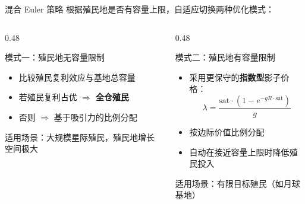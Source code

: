 \documentclass[aspectratio=169, 11pt]{beamer}
\begin{document}
\begin{frame}{混合 Euler 策略}
  根据殖民地是否有容量上限，自适应切换两种优化模式：

  \vspace{0.3cm}
  \begin{columns}[T]
    \begin{column}{0.48\textwidth}
      \begin{block}{模式一：殖民地无容量限制}
        \begin{itemize}
          \item 比较殖民复利效应与基地总容量
          \item 若殖民复利占优 $\Rightarrow$ \textbf{全仓殖民}
          \item 否则 $\Rightarrow$ 基于吸引力的比例分配
        \end{itemize}
        \vspace{0.1cm}
        {\small 适用场景：大规模星际殖民，殖民地增长空间极大}
      \end{block}
    \end{column}
    \begin{column}{0.48\textwidth}
      \begin{block}{模式二：殖民地有容量限制}
        \begin{itemize}
          \item 采用更保守的\textbf{指数型}影子价格：
          \[
            \lambda = \frac{\text{sat} \cdot (1 - e^{-gR \cdot \text{sat}})}{g}
          \]
          \item 按边际价值比例分配
          \item 自动在接近容量上限时降低殖民投入
        \end{itemize}
        \vspace{0.1cm}
        {\small 适用场景：有限目标殖民（如月球基地）}
      \end{block}
    \end{column}
  \end{columns}

\end{frame}
\end{document}
